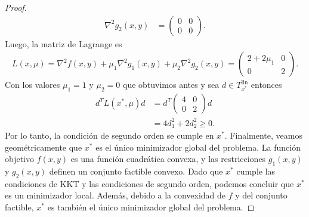 \documentclass{article}
\begin{document}
\begin{proof}
\begin{align*}
        \nabla^2 g_2(x, y) & = \begin{pmatrix}
                                   0 & 0 \\
                                   0 & 0
                               \end{pmatrix}.
    \end{align*}
    Luego, la matriz de Lagrange es \begin{align*}
        L(x, \mu) = \nabla^2 f(x, y) + \mu_1 \nabla^2 g_1(x, y) + \mu_2 \nabla^2 g_2(x, y) = \begin{pmatrix}
                                                                                                 2 + 2\mu_1 & 0 \\
                                                                                                 0          & 2
                                                                                             \end{pmatrix}.
    \end{align*}
    Con los valores \( \mu_1 = 1 \) y \( \mu_2 = 0 \) que obtuvimos antes y sea \( d \in T^\text{lin}_{x^*} \) entonces \begin{align*}
        d^T L(x^*, \mu) d & = d^T \begin{pmatrix}
                                      4 & 0 \\
                                      0 & 2
                                  \end{pmatrix} d       \\
                          & = 4 d_1^2 + 2 d_2^2 \geq 0.
    \end{align*}
    Por lo tanto, la condición de segundo orden se cumple en \( x^* \). Finalmente, veamos geométricamente que \( x^* \) es el único minimizador global del problema.
    La función objetivo \( f(x, y) \) es una función cuadrática convexa, y las restricciones \( g_1(x, y) \) y \( g_2(x, y) \) definen un conjunto factible convexo.
    Dado que \( x^* \) cumple las condiciones de KKT y las condiciones de segundo orden, podemos concluir que \( x^* \) es un minimizador local.
    Además, debido a la convexidad de \( f \) y del conjunto factible, \( x^* \) es también el único minimizador global del problema.
\end{proof}
\end{document}
